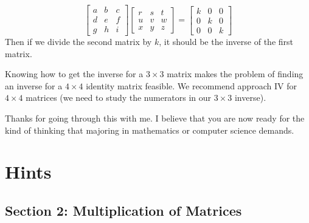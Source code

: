 \documentclass{article}
\begin{document}
\begin{enumerate}[\hspace{0.5cm}(I)]
    \begin{equation*}
      \begin{bmatrix} a & b & c \\ d & e & f \\ g & h & i \end{bmatrix}
      \begin{bmatrix} r & s & t \\ u & v & w \\ x & y & z \end{bmatrix}
      = \begin{bmatrix} k & 0 & 0 \\ 0 & k & 0 \\ 0 & 0 & k \end{bmatrix}
    \end{equation*}
    Then if we divide the second matrix by $k$, it should be the inverse of the first matrix.
\end{enumerate}

Knowing how to get the inverse for a $3 \times 3$ matrix makes the problem of finding an inverse for a $4 \times 4$ identity matrix feasible. We recommend approach IV for $4 \times 4$ matrices (we need to study the numerators in our $3 \times 3$ inverse).

\vspace{1cm}

Thanks for going through this with me. I believe that you are now ready for the kind of thinking that majoring in mathematics or computer science demands.




\newpage

\section{Hints}

\subsection*{Section 2: Multiplication of Matrices}
\end{document}
